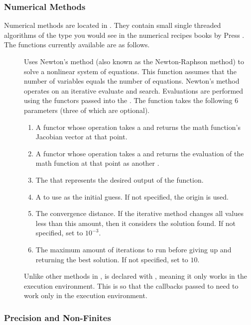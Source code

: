 \subsubsection{Numerical Methods}

Numerical methods are located in . They
contain small single threaded algorithms of the type you would see in the
numerical recipes books by Press \etal{}. The functions
currently available are as follows.

\begin{description}
\item[] Uses Newton's method (also known as the
  Newton-Raphson method) to solve a nonlinear system of equations. This
  function assumes that the number of variables equals the number of
  equations. Newton's method operates on an iterative evaluate and
  search. Evaluations are performed using the functors passed into the
  . The function takes the following 6
  parameters (three of which are optional).
  \begin{enumerate}
  \item A functor whose operation takes a  and returns the
    math function's Jacobian vector at that point.
  \item A functor whose operation takes a  and returns the
    evaluation of the math function at that point as another .
  \item The  that represents the desired output of the function.
  \item A  to use as the initial guess. If not specified, the
    origin is used.
  \item The convergence distance. If the iterative method changes all
    values less than this amount, then it considers the solution found. If
    not specified, set to $10^{-3}$.
  \item The maximum amount of iterations to run before giving up and
    returning the best solution. If not specified, set to $10$.
  \end{enumerate}
  Unlike other methods in \daxmath{},  is
  declared with , meaning it only works in the
  execution environment. This is so that the callbacks passed to
   need to work only in the execution
  environment.
\end{description}

\subsubsection{Precision and Non-Finites}

